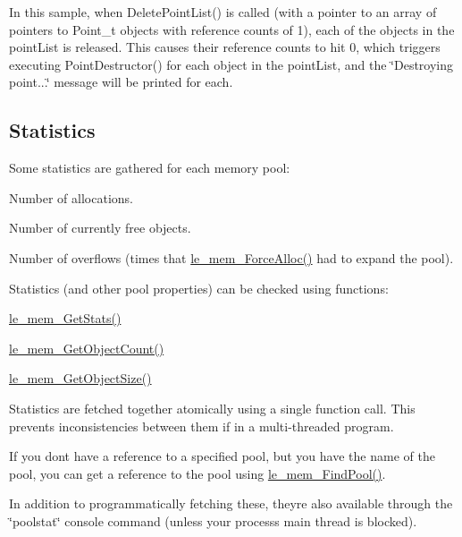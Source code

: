 In this sample, when Delete\+Point\+List() is called (with a pointer to an array of pointers to Point\+\_\+t objects with reference counts of 1), each of the objects in the point\+List is released. This causes their reference counts to hit 0, which triggers executing Point\+Destructor() for each object in the point\+List, and the \char`\"{}\+Destroying point...\char`\"{} message will be printed for each.\hypertarget{c_memory_mem_stats}{}\subsection{Statistics}\label{c_memory_mem_stats}
Some statistics are gathered for each memory pool\+:
\begin{DoxyItemize}
\item Number of allocations.
\item Number of currently free objects.
\item Number of overflows (times that \hyperlink{le__mem_8h_af7c289c73d4182835a26a9099f3db359}{le\+\_\+mem\+\_\+\+Force\+Alloc()} had to expand the pool).
\end{DoxyItemize}

Statistics (and other pool properties) can be checked using functions\+:
\begin{DoxyItemize}
\item {\ttfamily \hyperlink{le__mem_8h_ab7b41431c57c8c7b5c4ff1501fd5b772}{le\+\_\+mem\+\_\+\+Get\+Stats()}} 
\item {\ttfamily \hyperlink{le__mem_8h_a76725588ed757ca95cdf36e5ab3aeebf}{le\+\_\+mem\+\_\+\+Get\+Object\+Count()}} 
\item {\ttfamily \hyperlink{le__mem_8h_a0f6fbc0c886486a1e19fc43143991c66}{le\+\_\+mem\+\_\+\+Get\+Object\+Size()}} 
\end{DoxyItemize}

Statistics are fetched together atomically using a single function call. This prevents inconsistencies between them if in a multi-\/threaded program.

If you don\textquotesingle{}t have a reference to a specified pool, but you have the name of the pool, you can get a reference to the pool using {\ttfamily \hyperlink{le__mem_8h_a67e004702344963aea788b1c0ca70862}{le\+\_\+mem\+\_\+\+Find\+Pool()}}.

In addition to programmatically fetching these, they\textquotesingle{}re also available through the \char`\"{}poolstat\char`\"{} console command (unless your process\textquotesingle{}s main thread is blocked).

